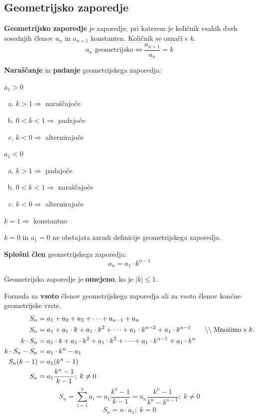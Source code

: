 \documentclass[a4paper,oneside,12pt,fleqn]{article}
\newcommand\krat\cdot
\newcommand{\comment}[1]{\ensuremath{\qquad\backslash\backslash\;}\textnormal{#1}}
\renewcommand\implies\Rightarrow
\renewcommand\iff\Leftrightarrow
\numberwithin{equation}{section}
\newenvironment{enumerate*}%
{
\vspace{-12pt}%
\begin{enumerate}%
\setlength{\itemsep}{0pt}%
\setlength{\parskip}{2pt}}%
{\end{enumerate}}
\begin{document}
\subsection{Geometrijsko zaporedje}
\label{sec:zap:geom}
\textbf{Geometrijsko zaporedje} je zaporedje, pri katerem je količnik vsakih dveh sosednjih členov
$a_n$ in $a_{n+1}$ konstanten. Količnik se označi s $k$.
\[ a_n \text{ geometrijsko} \iff \frac{a_{n+1}}{a_n} = k \]

\textbf{Naraščanje} in \textbf{padanje} geometrijskega zaporedja:
\begin{enumerate*}
  \item $a_1 > 0$
    \begin{enumerate}[a)]
      \item $k > 1 \implies $ naraščajoče
      \item $0 < k < 1 \implies $ padajoče
      \item $k < 0 \implies $ alternirajoče
    \end{enumerate}
  \item $a_1 < 0$
    \begin{enumerate}[a)]
      \item $k > 1 \implies $ padajoče
      \item $0 < k < 1 \implies $ naraščajoče
      \item $k < 0 \implies $ alternirajoče
    \end{enumerate}
  \item $k = 1 \implies $ konstantno
  \item $k = 0$ in $a_1 = 0$ ne obstajata zaradi definicije geometrijskega zaporedja.
\end{enumerate*}

\textbf{Splošni člen} geometrijskega zaporedja:
\[ a_n = a_1\krat k^{n-1} \]

Geometrijsko zaporedje je \textbf{omejeno}, ko je $\left| k \right| \le 1$.

Formula za \textbf{vsoto} členov geometrijskega zaporedja ali za vsoto členov končne
geometrijske vrste.
\begin{align*}
  S_n &= a_1 + a_2 + a_3 + \cdots + a_{n-1} + a_n \\
  S_n &= a_1 + a_1\krat k + a_1\krat k^2 + \cdots + a_1\krat k^{n-2} + a_1\krat k^{n-1}
  \comment{Množimo s $k$.}\\
  k\krat S_n &= a_1\krat k + a_1\krat k^2 + a_1\krat k^3 + \cdots + a_1\krat k^{n-1} + a_1\krat
  k^n \\
  k\krat S_n - S_n &=  a_1 \krat k^n - a_1 \\
  S_n(k-1) &= a_1(k^n -1) \\
  S_n &= a_1\frac{k^n - 1}{k-1}; \; k \neq 0
\end{align*}
\begin{equation}
  S_n = \sum_{i=1}^n a_i = a_1\frac{k^n-1}{k-1} = a_n\frac{k^n -1}{k^n - k^{n-1}}; \; k \neq 0 
  \label{eq:zap:geomsum}
\end{equation}
\[ S_n = n\krat a_1; \; k = 0 \]
\end{document}
